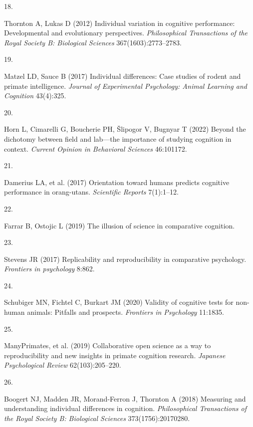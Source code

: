 \documentclass[
  man,floatsintext]{apa6}
\newlength{\cslhangindent}
\newlength{\csllabelwidth}
\newlength{\cslentryspacingunit} %
\newenvironment{CSLReferences}[2] %
 {%
  \setlength{\parindent}{0pt}
  \ifodd #1
  \let\oldpar\par
  \def\par{\hangindent=\cslhangindent\oldpar}
  \fi
  \setlength{\parskip}{#2\cslentryspacingunit}
 }%
 {}
\newcommand{\CSLLeftMargin}[1]{\parbox[t]{\csllabelwidth}{#1}}
\newcommand{\CSLRightInline}[1]{\parbox[t]{\linewidth - \csllabelwidth}{#1}\break}
\begin{document}
\begin{CSLReferences}{0}{0}
\leavevmode{}%
\CSLLeftMargin{18. }%
\CSLRightInline{Thornton A, Lukas D (2012) Individual variation in cognitive performance: Developmental and evolutionary perspectives. \emph{Philosophical Transactions of the Royal Society B: Biological Sciences} 367(1603):2773--2783.}

\leavevmode{}%
\CSLLeftMargin{19. }%
\CSLRightInline{Matzel LD, Sauce B (2017) Individual differences: Case studies of rodent and primate intelligence. \emph{Journal of Experimental Psychology: Animal Learning and Cognition} 43(4):325.}

\leavevmode{}%
\CSLLeftMargin{20. }%
\CSLRightInline{Horn L, Cimarelli G, Boucherie PH, Šlipogor V, Bugnyar T (2022) Beyond the dichotomy between field and lab---the importance of studying cognition in context. \emph{Current Opinion in Behavioral Sciences} 46:101172.}

\leavevmode{}%
\CSLLeftMargin{21. }%
\CSLRightInline{Damerius LA, et al. (2017) Orientation toward humans predicts cognitive performance in orang-utans. \emph{Scientific Reports} 7(1):1--12.}

\leavevmode{}%
\CSLLeftMargin{22. }%
\CSLRightInline{Farrar B, Ostojic L (2019) The illusion of science in comparative cognition.}

\leavevmode{}%
\CSLLeftMargin{23. }%
\CSLRightInline{Stevens JR (2017) Replicability and reproducibility in comparative psychology. \emph{Frontiers in psychology} 8:862.}

\leavevmode{}%
\CSLLeftMargin{24. }%
\CSLRightInline{Schubiger MN, Fichtel C, Burkart JM (2020) Validity of cognitive tests for non-human animals: Pitfalls and prospects. \emph{Frontiers in Psychology} 11:1835.}

\leavevmode{}%
\CSLLeftMargin{25. }%
\CSLRightInline{ManyPrimates, et al. (2019) Collaborative open science as a way to reproducibility and new insights in primate cognition research. \emph{Japanese Psychological Review} 62(103):205--220.}

\leavevmode{}%
\CSLLeftMargin{26. }%
\CSLRightInline{Boogert NJ, Madden JR, Morand-Ferron J, Thornton A (2018) Measuring and understanding individual differences in cognition. \emph{Philosophical Transactions of the Royal Society B: Biological Sciences} 373(1756):20170280.}


\end{CSLReferences}
\end{document}
